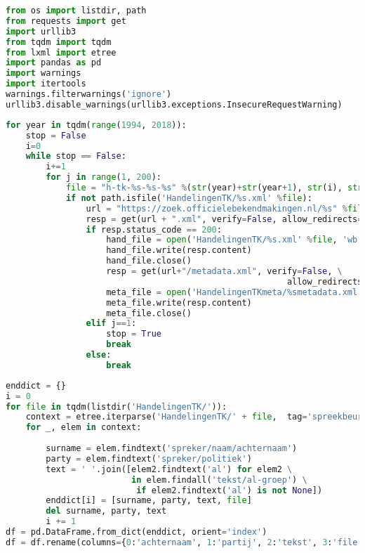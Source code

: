 \begin{lstlisting}[language=Python]
%matplotlib inline
from os import listdir, path
from requests import get
import urllib3
from tqdm import tqdm
from lxml import etree
import pandas as pd
import warnings
import itertools
warnings.filterwarnings('ignore')
urllib3.disable_warnings(urllib3.exceptions.InsecureRequestWarning)
\end{lstlisting}

\begin{lstlisting}[language=Python]
for year in tqdm(range(1994, 2018)):
    stop = False
    i=0
    while stop == False:
        i+=1
        for j in range(1, 200):
            file = "h-tk-%s-%s-%s" %(str(year)+str(year+1), str(i), str(j))
            if not path.isfile('HandelingenTK/%s.xml' %file):
                url = "https://zoek.officielebekendmakingen.nl/%s" %file
                resp = get(url + ".xml", verify=False, allow_redirects=False)
                if resp.status_code == 200:
                    hand_file = open('HandelingenTK/%s.xml' %file, 'wb')
                    hand_file.write(resp.content)
                    hand_file.close()
                    resp = get(url+"/metadata.xml", verify=False, \
                                                        allow_redirects=False)
                    meta_file = open('HandelingenTKmeta/%smetadata.xml' %file, 'wb')
                    meta_file.write(resp.content)
                    meta_file.close()    
                elif j==1:
                    stop = True
                    break
                else:
                    break
\end{lstlisting}

\begin{lstlisting}[language=Python]
enddict = {}
i = 0
for file in tqdm(listdir('HandelingenTK/')):
    context = etree.iterparse('HandelingenTK/' + file,  tag='spreekbeurt')
    for _, elem in context:
        
        surname = elem.findtext('spreker/naam/achternaam')
        party = elem.findtext('spreker/politiek')
        text = ' '.join([elem2.findtext('al') for elem2 \
                         in elem.findall('tekst/al-groep') \
                          if elem2.findtext('al') is not None])
        enddict[i] = [surname, party, text, file]
        del surname, party, text
        i += 1
df = pd.DataFrame.from_dict(enddict, orient='index')
df = df.rename(columns={0:'achternaam', 1:'partij', 2:'tekst', 3:'file'})
\end{lstlisting}

